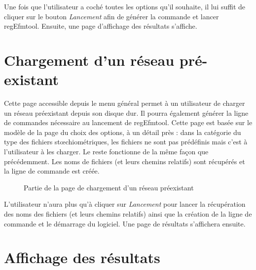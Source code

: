 Une fois que l'utilisateur a coché toutes les options qu'il souhaite, il lui suffit de cliquer sur le bouton \emph{Lancement} afin de générer la commande et lancer regEfmtool. Ensuite, une page d'affichage des résultats s'affiche. 

\section{Chargement d'un réseau pré-existant}

Cette page accessible depuis le menu général permet à un utilisateur de charger un réseau préexistant depuis son disque dur. Il pourra également générer la ligne de commandes nécessaire au lancement de regEfmtool. Cette page est basée sur le modèle de la page du choix des options, à un détail près : dans la catégorie du type des fichiers stœchiométriques, les fichiers ne sont pas prédéfinis mais c'est à l'utilisateur à les charger. Le reste fonctionne de la m\^eme façon que précédemment. Les noms de fichiers (et leurs chemins relatifs) sont récupérés et la ligne de commande est créée. \\

\begin{figure}[!ht]
	\begin{center}
		\caption{Partie de la page de chargement d'un réseau préexistant}
  		\label{chargement}
  	\end{center}	
\end{figure}

L'utilisateur n'aura plus qu'à cliquer sur \textit{Lancement} pour lancer la récupération des noms des fichiers (et leurs chemins relatifs) ainsi que la création de la ligne de commande et le démarrage du logiciel. Une page de résultats s'affichera ensuite. 



\section{Affichage des résultats}















 